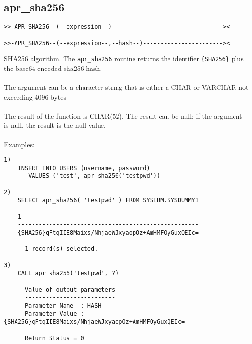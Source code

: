 \subsection{apr\_sha256} \label{aprsha256}
\begin{verbatim}
>>-APR_SHA256--(--expression--)--------------------------------><

>>-APR_SHA256--(--expression--,--hash--)-----------------------><
\end{verbatim}
SHA256 algorithm. The {\tt apr\_sha256} routine returns the identifier {\tt \{SHA256\}} plus the base64 encoded sha256 hash.\\
\\
The argument can be a character string that is either a \mbox{CHAR} or \mbox{VARCHAR} not exceeding 4096 bytes.\\
\\
The result of the function is CHAR(52). The result can be null; if the argument is null, the result is the null value.\\
\\
Examples:
\begin{verbatim}
1)
    INSERT INTO USERS (username, password)
       VALUES ('test', apr_sha256('testpwd'))

2)
    SELECT apr_sha256( 'testpwd' ) FROM SYSIBM.SYSDUMMY1

    1
    ----------------------------------------------------
    {SHA256}qFtqIIE8Maixs/NhjaeWJxyaopOz+AmHMFOyGuxQEIc=

      1 record(s) selected.

3)
    CALL apr_sha256('testpwd', ?)

      Value of output parameters
      --------------------------
      Parameter Name  : HASH
      Parameter Value : {SHA256}qFtqIIE8Maixs/NhjaeWJxyaopOz+AmHMFOyGuxQEIc=

      Return Status = 0
\end{verbatim}
\newpage
\hypertarget{hvalidatepw}{}
